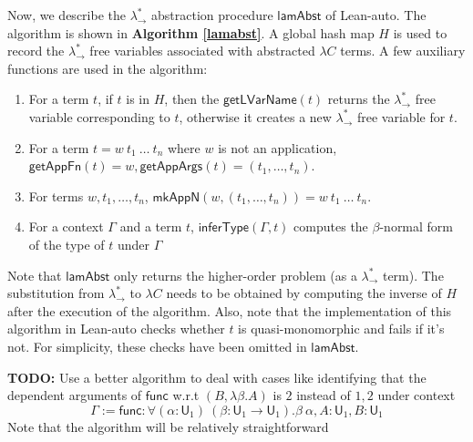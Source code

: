 \noindent Now, we describe the $\lambda_\to^*$ abstraction procedure $\mathsf{lamAbst}$ of Lean-auto. The algorithm
is shown in \textbf{Algorithm \ref{lamabst}}. A global hash map $H$ is used to record the $\lambda_\to^*$
free variables associated with abstracted $\lambda C$ terms. A few auxiliary functions are used in the algorithm:
\begin{enumerate}
  \item For a term $t$, if $t$ is in $H$, then the $\mathsf{getLVarName}(t)$ returns
    the $\lambda_\to^*$ free variable corresponding to $t$, otherwise it creates a new $\lambda_\to^*$ free variable for $t$.
  \item For a term $t = w \ t_1 \ \dots \ t_n$ where $w$ is not an application,
    $\mathsf{getAppFn}(t) = w, \mathsf{getAppArgs}(t) = (t_1, \dots, t_n)$.
  \item For terms $w, t_1, \dots, t_n$, $\mathsf{mkAppN}(w, (t_1, \dots, t_n)) = w \ t_1 \ \dots \ t_n$.
  \item For a context $\Gamma$ and a term $t$, $\mathsf{inferType}(\Gamma, t)$ computes the
    $\beta$-normal form of the type of $t$ under $\Gamma$
\end{enumerate}
Note that $\mathsf{lamAbst}$ only returns the higher-order problem (as a $\lambda_\to^*$ term). The
substitution from $\lambda_\to^*$ to $\lambda C$ needs to be obtained by computing the inverse of $H$ after
the execution of the algorithm. Also, note that the implementation of this algorithm in Lean-auto checks
whether $t$ is quasi-monomorphic and fails if it's not. For simplicity, these checks have been omitted in $\mathsf{lamAbst}$.

\noindent \textbf{TODO:} Use a better algorithm to deal with cases like identifying that
the dependent arguments of $\mathsf{func}$ w.r.t $(B, \lambda \beta. A)$ is $2$ instead of $1,2$ under context
$$\Gamma := \mathsf{func} : \forall (\alpha : \mathsf{U}_1) \ (\beta : \mathsf{U}_1 \to \mathsf{U}_1). \beta \ \alpha,
  A : \mathsf{U}_1, B : \mathsf{U}_1$$
Note that the algorithm will be relatively straightforward